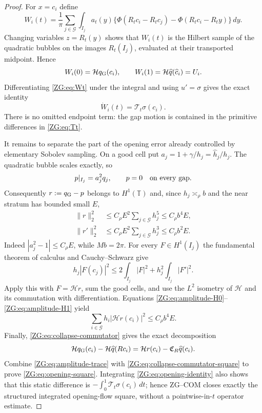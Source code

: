 \documentclass[11pt]{amsart}
\numberwithin{equation}{section}
\theoremstyle{definition}
\theoremstyle{remark}
\newcommand{\T}{\mathbb T}
\newcommand{\Hil}{\mathcal H}
\begin{document}
\begin{proof}
For $x=c_i$ define
\begin{equation}\label{ZG:eq:Wt}
 W_i(t)=\frac1\pi\sum_{j\in\mathcal G}\int_{I_j}a_t(y)
 \{\Phi(R_tc_i-R_tc_j)-\Phi(R_tc_i-R_ty)\}\,dy.
\end{equation}
Changing variables $z=R_t(y)$ shows that $W_i(t)$ is the Hilbert
sample of the quadratic bubbles on the images $R_t(I_j)$, evaluated at
their transported midpoint.  Hence
\[
 W_i(0)=\Hil q_{\rm G}(c_i),
 \qquad W_i(1)=\Hil\widehat q(\widehat c_i)=U_i.
\]
Differentiating \eqref{ZG:eq:Wt} under the integral and using $u'=\sigma$
gives the exact identity
\begin{equation}\label{ZG:eq:opening-identity}
 \dot W_i(t)=\mathcal T_t\sigma(c_i).
\end{equation}
There is no omitted endpoint term: the gap motion is contained in the
primitive differences in \eqref{ZG:eq:Tt}.

It remains to separate the part of the opening error already controlled
by elementary Sobolev sampling.  On a good cell put
$a_j=1+\gamma/h_j=\widehat h_j/h_j$.  The quadratic bubble scales
exactly, so
\begin{equation}\label{ZG:eq:pullback-bubble}
 p|_{I_j}=a_j^2q_j,
 \qquad p=0\quad\hbox{on every gap}.
\end{equation}
Consequently $r:=q_{\rm G}-p$ belongs to $H^1(\T)$ and, since
$h_j\asymp_\rho b$ and the near stratum has bounded small $E$,
\begin{align}
 \|r\|_2^2
 &\le C_\rho E^2\sum_{j\in\mathcal G}h_j^5
 \le C_\rho b^4E,\label{ZG:eq:amplitude-H0}\\
 \|r'\|_2^2
 &\le C_\rho E^2\sum_{j\in\mathcal G}h_j^3
 \le C_\rho b^2E.\label{ZG:eq:amplitude-H1}
\end{align}
Indeed $|a_j^2-1|\le C_\rho E$, while
$Mb=2\pi$.  For every $F\in H^1(I_j)$ the fundamental theorem of
calculus and Cauchy--Schwarz give
\[
 h_j|F(c_j)|^2
 \le2\int_{I_j}|F|^2+h_j^2\int_{I_j}|F'|^2.
\]
Apply this with $F=\Hil r$, sum the good cells, and use the $L^2$
isometry of $\Hil$ and its commutation with differentiation.  Equations
\eqref{ZG:eq:amplitude-H0}--\eqref{ZG:eq:amplitude-H1} yield
\begin{equation}\label{ZG:eq:amplitude-trace}
 \sum_{i\in\mathcal G}h_i|\Hil r(c_i)|^2
 \le C_\rho b^4E.
\end{equation}
Finally, \eqref{ZG:eq:collapse-commutator} gives the exact decomposition
\[
 \Hil q_{\rm G}(c_i)-\Hil\widehat q(Rc_i)
 =\Hil r(c_i)-\mathfrak C_R\widehat q(c_i).
\]
Combine \eqref{ZG:eq:amplitude-trace} with
\eqref{ZG:eq:collapse-commutator-square} to prove
\eqref{ZG:eq:opening-square}.  Integrating
\eqref{ZG:eq:opening-identity} also shows that this static difference is
$-\int_0^1\mathcal T_t\sigma(c_i)\,dt$; hence ZG--COM closes exactly the
structured integrated opening-flow square, without a pointwise-in-$t$
operator estimate.

\end{proof}
\end{document}

